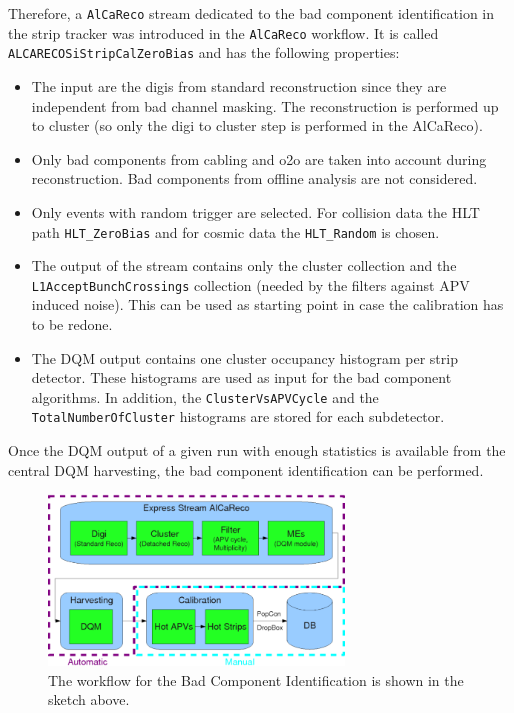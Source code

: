 Therefore, a \texttt{AlCaReco} stream dedicated to the bad component identification in the strip tracker was introduced in the \texttt{AlCaReco} workflow. It is called \texttt{ALCARECOSiStripCalZeroBias} and has the following properties:
\begin{itemize}
\item  The input are the digis from standard reconstruction since they are independent from bad channel masking. The reconstruction is performed up to cluster (so only the digi to cluster step is performed in the AlCaReco).
\item Only bad components from cabling and o2o are taken into account during reconstruction. Bad components from offline analysis are not considered.
\item Only events with random trigger are selected. For collision data the HLT path \texttt{HLT\_ZeroBias} and for cosmic data the \texttt{HLT\_Random} is chosen.
\item The output of the stream contains only the cluster collection and the \texttt{L1AcceptBunchCrossings} collection (needed by the filters against APV induced noise). This can be used as starting point in case the calibration has to be redone.
\item The DQM output contains one cluster occupancy histogram per strip detector. These histograms are used as input for the bad component algorithms. In addition, the \texttt{ClusterVsAPVCycle} and the \texttt{TotalNumberOfCluster} histograms are stored for each subdetector. 
\end{itemize}

Once the DQM output of a given run with enough statistics is available from the central DQM harvesting, the bad component identification can be performed.

\begin{figure}[htbp]
   \centering
	\includegraphics[width=0.7\textwidth]{figures/BadComponentWorkflow_small.png}
   \caption{The workflow for the Bad Component Identification is shown in the sketch above.}
   \label{fig:fill10200PCL}
\end{figure}

